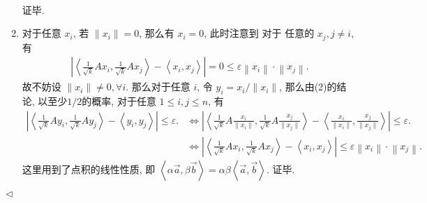 \documentclass[11pt]{article}
\newenvironment{answer}[1][Solution]{\begin{trivlist}
    \item[\hskip \labelsep {\bfseries #1.}\hskip \labelsep]}{\hfill$\lhd$\end{trivlist}}
\newcommand\1{\mathds{1}}
\begin{document}
\begin{answer}
\begin{enumerate}[label=(\arabic*)]
\begin{align*}
        \end{align*}        
        证毕.
        \item 对于任意 $x_i$, 若 $\| x_i \| = 0$, 那么有 $x_i = 0$, 此时注意到 对于 任意的 $x_j, j\neq i$, 有
        \begin{align*}
            \left|\left\langle \frac{1}{\sqrt{k}}Ax_i, \frac{1}{\sqrt{k}}Ax_j\right\rangle - \left\langle x_i, x_j \right\rangle\right| = 0 \le \varepsilon \left\| x_i \right\| \cdot \left\|x_j\right\|.
        \end{align*}
        故不妨设 $\|x_i\| \neq 0, \forall i$. 那么对于任意 $i$, 令 $y_i = x_i/\|x_i\|$, 那么由(2)的结论, 以至少$1/2$的概率, 对于任意 $1\le i,j \le n$, 有
        \begin{align*}
            \left|\left\langle \frac{1}{\sqrt{k}}Ay_i, \frac{1}{\sqrt{k}}Ay_j \right\rangle - \left\langle y_i, y_j \right\rangle\right| \le \varepsilon. &\iff  \left|\left\langle \frac{1}{\sqrt{k}}A\frac{x_i}{\|x_i\|}, \frac{1}{\sqrt{k}}A\frac{x_j}{\|x_j\|} \right\rangle - \left\langle \frac{x_i}{\|x_i\|}, \frac{x_j}{\|x_j\|} \right\rangle\right| \le \varepsilon.\\
            &\iff  \left|\left\langle \frac{1}{\sqrt{k}}Ax_i, \frac{1}{\sqrt{k}}Ax_j\right\rangle - \left\langle x_i, x_j \right\rangle\right| \le \varepsilon \left\| x_i \right\| \cdot \left\|x_j\right\|.
        \end{align*}
        这里用到了点积的线性性质, 即 $\left\langle \alpha \vec{a}, \beta \vec{b} \right\rangle = \alpha\beta \left\langle \vec{a}, \vec{b} \right\rangle$. 证毕.
    \end{enumerate}
\end{answer}
\end{document}
